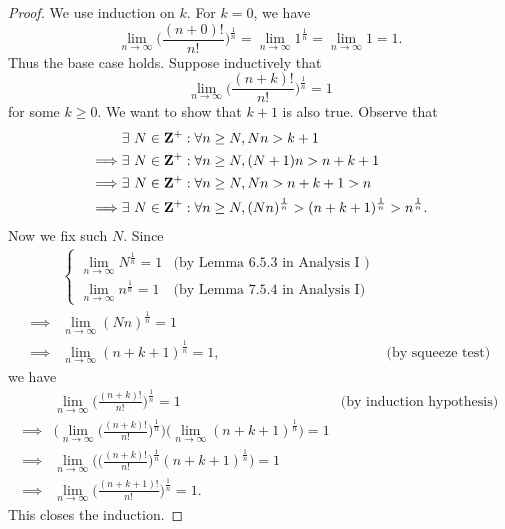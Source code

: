 \begin{proof}
    We use induction on \(k\).
    For \(k = 0\), we have
    \[
        \lim_{n \to \infty} \bigg(\frac{(n + 0)!}{n!}\bigg)^{\frac{1}{n}} = \lim_{n \to \infty} 1^{\frac{1}{n}} = \lim_{n \to \infty} 1 = 1.
    \]
    Thus the base case holds.
    Suppose inductively that
    \[
        \lim_{n \to \infty} \bigg(\frac{(n + k)!}{n!}\bigg)^{\frac{1}{n}} = 1
    \]
    for some \(k \geq 0\).
    We want to show that \(k + 1\) is also true.
    Observe that
    \begin{align*}
                 & \exists\ N \in \mathbf{Z}^+ : \forall n \geq N, Nn > k + 1                                                        \\
        \implies & \exists\ N \in \mathbf{Z}^+ : \forall n \geq N, (N + 1)n > n + k + 1                                              \\
        \implies & \exists\ N \in \mathbf{Z}^+ : \forall n \geq N, Nn > n + k + 1 > n                                                \\
        \implies & \exists\ N \in \mathbf{Z}^+ : \forall n \geq N, (Nn)^{\frac{1}{n}} > (n + k + 1)^{\frac{1}{n}} > n^{\frac{1}{n}}.
    \end{align*}
    Now we fix such \(N\).
    Since
    \begin{align*}
                 & \begin{cases}
                       \lim_{n \to \infty} N^{\frac{1}{n}} = 1 & \text{(by Lemma 6.5.3 in Analysis I )} \\
                       \lim_{n \to \infty} n^{\frac{1}{n}} = 1 & \text{(by Lemma 7.5.4 in Analysis I)}
                   \end{cases}                               \\
        \implies & \lim_{n \to \infty} (Nn)^{\frac{1}{n}} = 1                                                                                \\
        \implies & \lim_{n \to \infty} (n + k + 1)^{\frac{1}{n}} = 1,                                             & \text{(by squeeze test)}
    \end{align*}
    we have
    \begin{align*}
                 & \lim_{n \to \infty} \bigg(\frac{(n + k)!}{n!}\bigg)^{\frac{1}{n}} = 1                                                                       & \text{(by induction hypothesis)} \\
        \implies & \Bigg(\lim_{n \to \infty} \bigg(\frac{(n + k)!}{n!}\bigg)^{\frac{1}{n}}\Bigg) \bigg(\lim_{n \to \infty} (n + k + 1)^{\frac{1}{n}}\bigg) = 1                                    \\
        \implies & \lim_{n \to \infty} \Bigg(\bigg(\frac{(n + k)!}{n!}\bigg)^{\frac{1}{n}} (n + k + 1)^{\frac{1}{n}}\Bigg) = 1                                                                    \\
        \implies & \lim_{n \to \infty} \bigg(\frac{(n + k + 1)!}{n!}\bigg)^{\frac{1}{n}} = 1.
    \end{align*}
    This closes the induction.
\end{proof}

